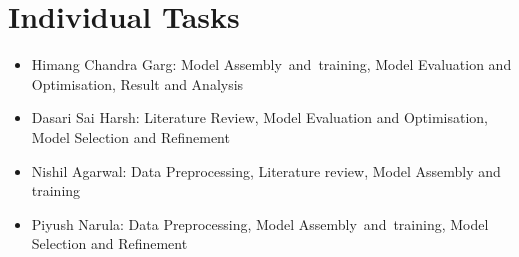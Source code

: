 \documentclass[10pt,twocolumn,letterpaper]{article}
\begin{document}
\section{Individual Tasks}

\begin{itemize}\setlength\itemsep{-0.4em}
    \item Himang Chandra Garg: Model Assembly and training, Model Evaluation and Optimisation, Result and Analysis
    \item Dasari Sai Harsh: Literature Review, Model Evaluation and Optimisation, Model Selection and Refinement
    \item Nishil Agarwal: Data Preprocessing, Literature review, Model Assembly and training
    \item Piyush Narula: Data Preprocessing, Model Assembly and training, Model Selection and Refinement
\end{itemize}
\end{document}
